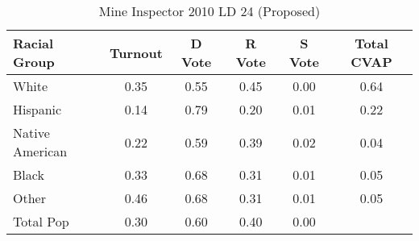 \begin{table}[htb]
\begin{center}
\caption{Mine Inspector 2010 LD 24 (Proposed)}
\label{smine_cvap_ld_24}
\begin{tabular}{lccccc}
  \hline
Racial Group & Turnout & D Vote & R Vote & S Vote & Total CVAP \\ 
  \hline
White & 0.35 & 0.55 & 0.45 & 0.00 & 0.64 \\ 
  Hispanic & 0.14 & 0.79 & 0.20 & 0.01 & 0.22 \\ 
  Native American & 0.22 & 0.59 & 0.39 & 0.02 & 0.04 \\ 
  Black & 0.33 & 0.68 & 0.31 & 0.01 & 0.05 \\ 
  Other & 0.46 & 0.68 & 0.31 & 0.01 & 0.05 \\ 
  Total Pop & 0.30 & 0.60 & 0.40 & 0.00 &  \\ 
   \hline
\end{tabular}
\end{center}
\end{table}
